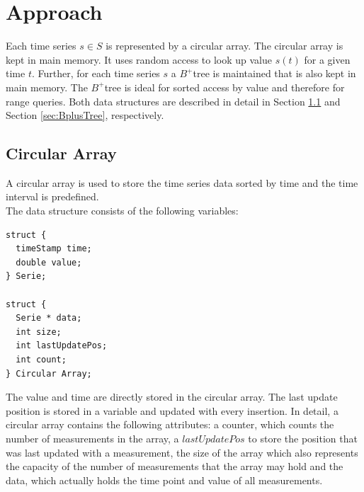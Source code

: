 \documentclass[abstracton,12pt]{scrreprt}
\begin{document}
\chapter{Approach}
\label{sec:Approach}
Each time series $s \in S$ is represented by a circular array. The circular array is kept in main memory. It uses random access to look up value $s(t)$ for a given time $t$. Further, for each time series $s$ a $B^+$tree is maintained that is also kept in main memory. The $B^+$tree is ideal for sorted access by value and therefore for range queries. Both data structures are described in detail in Section \ref{sec:circularArray} and Section \ref{sec:BplusTree}, respectively.


\section{Circular Array}
\label{sec:circularArray}
A circular array is used to store the time series data sorted by time and the time interval is predefined.\\ The data structure consists of the following variables: 

\lstset{language=C}
\begin{lstlisting}
struct {
  timeStamp time;
  double value;
} Serie;
	
struct {
  Serie * data;
  int size;
  int lastUpdatePos;
  int count;
} Circular Array;
\end{lstlisting}
\BlankLine
The value and time are directly stored in the circular array. The last update position is stored in a variable and updated with every insertion. In detail, a circular array contains the following attributes: a counter, which counts the number of measurements in the array, a $lastUpdatePos$ to store the position that was last updated with a measurement, the size of the array which also represents the capacity of the number of measurements that the array may hold and the data, which actually holds the time point and value of all measurements.
\end{document}
